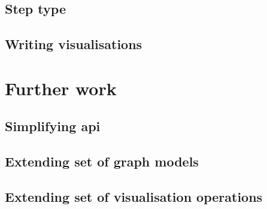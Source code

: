 \documentclass[12pt, letterpaper]{article}
\begin{document}
\subsection{Step type}

\subsection{Writing visualisations}


\clearpage


\section{Further work}

\subsection{Simplifying api}

\subsection{Extending set of graph models}

\subsection{Extending set of visualisation operations}

\clearpage
\end{document}
